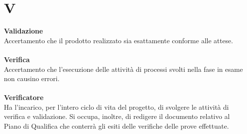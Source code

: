 \section{V}
\textbf{Validazione}\\
Accertamento che il prodotto realizzato sia esattamente conforme alle attese. \\ \\
\textbf{Verifica}\\
Accertamento che l'esecuzione delle attività di processi svolti nella fase in esame non causino errori. \\ \\
\textbf{Verificatore}\\
Ha l'incarico, per l'intero ciclo di vita del progetto, di svolgere le attività di verifica e validazione. Si occupa, inoltre, di redigere il documento relativo al Piano di Qualifica che conterrà gli esiti delle verifiche delle prove effettuate. \\ \\
\clearpage